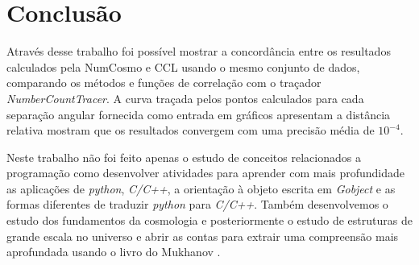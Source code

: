 	\chapter*{Conclusão}

Através desse trabalho foi possível mostrar a concordância entre os resultados calculados pela NumCosmo e CCL usando o mesmo conjunto de dados, comparando os métodos e funções de correlação com o traçador \textit{NumberCountTracer}. A  curva traçada pelos pontos calculados para cada separação angular fornecida como entrada em gráficos apresentam a distância relativa mostram que os resultados convergem com uma precisão média de $ 10^{-4} $.

Neste trabalho não foi feito apenas o estudo de conceitos relacionados a programação como desenvolver atividades para aprender com mais profundidade as aplicações de \textit{python}, \textit{C/C++}, a orientação à objeto escrita em \textit{Gobject} e as formas diferentes de traduzir \textit{python} para \textit{C/C++}. Também desenvolvemos o estudo dos fundamentos da cosmologia e posteriormente o estudo de estruturas de grande escala no universo e abrir as contas para extrair uma compreensão mais aprofundada usando o livro do Mukhanov \cite{mukhanov}.